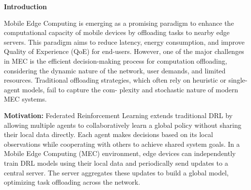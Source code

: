 \documentclass[12pt]{article}
\begin{document}
\noindent\large\textbf{Introduction}

\vspace{1.5mm}
\normalsize

Mobile Edge Computing is emerging as a promising paradigm to enhance the computational capacity of mobile devices by offloading tasks to nearby edge servers. This paradigm aims to reduce latency, energy consumption, and improve Quality of Experience (QoE) for end-users. However, one of the major challenges in MEC is the efficient decision-making process for computation offloading, considering the dynamic nature of the network, user demands, and limited resources. Traditional offloading strategies, which often rely on heuristic or single-agent models, fail to capture the com- plexity and stochastic nature of modern MEC systems. 

\newpage

	\noindent\textbf{\large Motivation:  } 
	Federated Reinforcement Learning extends traditional DRL by allowing multiple agents to collaboratively learn a global policy without sharing their local data directly. Each agent makes decisions based on its local observations while cooperating with others to achieve shared system goals. In a Mobile Edge Computing (MEC) environment, edge devices can independently train DRL models using their local data and periodically send updates to a central server. The server aggregates these updates to build a global model, optimizing task offloading across the network.
	
	
\end{document}
